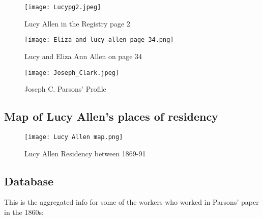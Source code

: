 \documentclass[
  letterpaper,
  DIV=11,
  numbers=noendperiod]{scrartcl}
\begin{document}
\begin{figure}

{\centering \texttt{[image: Lucypg2.jpeg]}

}

\caption{\label{fig-sample4}Lucy Allen in the Registry page 2}

\end{figure}

\begin{figure}

{\centering \texttt{[image: Eliza and lucy allen page 34.png]}

}

\caption{\label{fig-sample5}Lucy and Eliza Ann Allen on page 34}

\end{figure}

\begin{figure}

{\centering \texttt{[image: Joseph\_Clark.jpeg]}

}

\caption{\label{fig-sample8}Joseph C. Parsons' Profile}

\end{figure}

\hypertarget{map-of-lucy-allens-places-of-residency}{%
\subsection{Map of Lucy Allen's places of
residency}\label{map-of-lucy-allens-places-of-residency}}

\begin{figure}

{\centering \texttt{[image: Lucy Allen map.png]}

}

\caption{\label{fig-sample7}Lucy Allen Residency between 1869-91}

\end{figure}

\hypertarget{database}{%
\subsection{Database}\label{database}}

This is the aggregated info for some of the workers who worked in
Parsons' paper in the 1860s:
\end{document}
